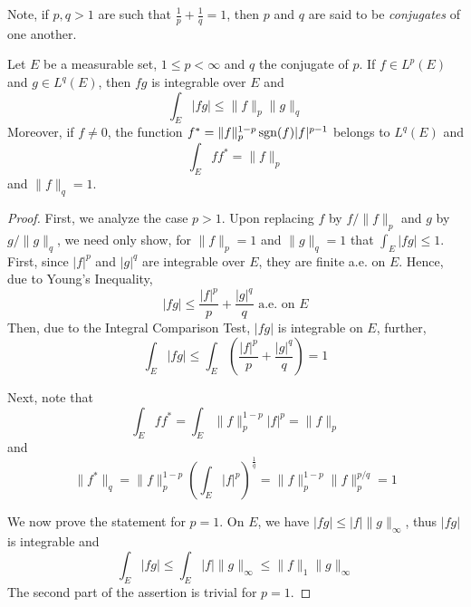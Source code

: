 Note, if $p,q > 1$ are such that $\frac{1}{p} + \frac{1}{q} = 1$, then $p$ and $q$ are said to be \textit{conjugates} of one another.

\begin{theorem}[H\"older]
    Let $E$ be a measurable set, $1\le p < \infty$ and $q$ the conjugate of $p$. If $f\in L^p(E)$ and $g\in L^q(E)$, then $fg$ is integrable over $E$ and 
    \begin{equation*}
        \int_E|fg|\le\|f\|_p\|g\|_q
    \end{equation*}
    Moreover, if $f\ne 0$, the function $f^* = \|f\|_p^{1 - p}\operatorname{sgn}(f)|f|^{p - 1}$ belongs to $L^q(E)$ and 
    \begin{equation*}
        \int_E ff^* = \|f\|_p 
    \end{equation*}
    and $\|f\|_q = 1$.
\end{theorem}
\begin{proof}
    First, we analyze the case $p > 1$. Upon replacing $f$ by $f/\|f\|_p$ and $g$ by $g/\|g\|_q$, we need only show, for $\|f\|_p = 1$ and $\|g\|_q = 1$ that $\int_E|fg|\le 1$. First, since $|f|^p$ and $|g|^q$ are integrable over $E$, they are finite a.e. on $E$. Hence, due to Young's Inequality, 
    \begin{equation*}
        |fg|\le\frac{|f|^p}{p} + \frac{|g|^q}{q}\text{ a.e. on }E
    \end{equation*}
    Then, due to the Integral Comparison Test, $|fg|$ is integrable on $E$, further, 
    \begin{equation*}
        \int_E|fg|\le\int_E\left(\frac{|f|^p}{p} + \frac{|g|^q}{q}\right) = 1
    \end{equation*}
    
    Next, note that 
    \begin{equation*}
        \int_E ff^* = \int_E\|f\|_p^{1 - p}|f|^p = \|f\|_p
    \end{equation*}
    and 
    \begin{equation*}
        \|f^*\|_q = \|f\|^{1 - p}_p\left(\int_E|f|^{p}\right)^{\frac{1}{q}} = \|f\|_p^{1 - p}\|f\|_p^{p/q} = 1
    \end{equation*}

    We now prove the statement for $p = 1$. On $E$, we have $|fg|\le|f|\|g\|_\infty$, thus $|fg|$ is integrable and 
    \begin{equation*}
        \int_E|fg|\le\int_E|f|\|g\|_\infty\le\|f\|_1\|g\|_\infty
    \end{equation*}
    The second part of the assertion is trivial for $p = 1$.
\end{proof}

